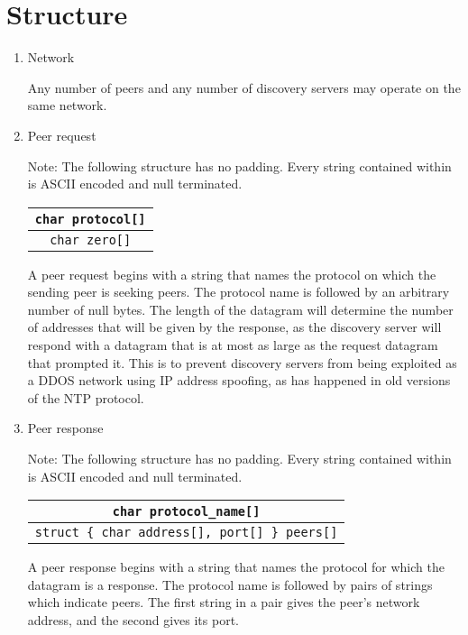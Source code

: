 \documentclass{article}
\newcommand{\code}[1]{\texttt{#1}}
\newcommand{\note}[1]{\begin{center} Note: #1 \end{center}}
\newcommand{\stringsnote}{\note{The following structure has no padding. Every string contained within is ASCII encoded and null terminated.}}
\begin{document}
\section{Structure}
\begin{enumerate}
\item Network

  Any number of peers and any number of discovery servers may operate on the same network.
    
\item Peer request

  \stringsnote
  
  \begin{center}
    \begin{tabular}{| c |}
      \hline
      \code{char protocol[]} \\
      \hline
      \code{char zero[]} \\
      \hline
    \end{tabular}
  \end{center}

  A peer request begins with a string that names the protocol on which the sending peer is seeking peers.
  The protocol name is followed by an arbitrary number of null bytes.
  The length of the datagram will determine the number of addresses that will be given by the response, as the discovery server will respond with a datagram that is at most as large as the request datagram that prompted it.
  This is to prevent discovery servers from being exploited as a DDOS network using IP address spoofing, as has happened in old versions of the NTP protocol.

\item Peer response

  \stringsnote
  
  \begin{center}
    \begin{tabular}[center]{| c |}
      \hline
      \code{char protocol\_name[]} \\
      \hline
      \code{struct \{ char address[], port[] \} peers[]} \\
      \hline
    \end{tabular}
  \end{center}

  A peer response begins with a string that names the protocol for which the datagram is a response.
  The protocol name is followed by pairs of strings which indicate peers.
  The first string in a pair gives the peer's network address, and the second gives its port.
\end{enumerate}
\end{document}
